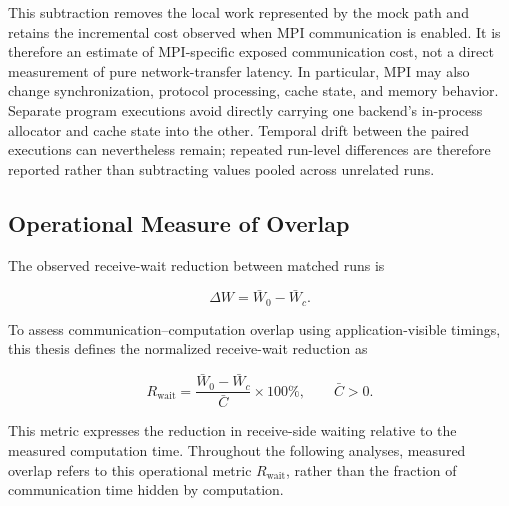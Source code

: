 This subtraction removes the local work represented by the mock path and
retains the incremental cost observed when MPI communication is enabled. It
is therefore an estimate of MPI-specific exposed communication cost, not a
direct measurement of pure network-transfer latency. In particular, MPI may
also change synchronization, protocol processing, cache state, and memory
behavior. Separate program executions avoid directly carrying one backend's
in-process allocator and cache state into the other. Temporal drift between
the paired executions can nevertheless remain; repeated run-level differences
are therefore reported rather than subtracting values pooled across unrelated
runs.

\subsection{Operational Measure of Overlap}

The observed receive-wait reduction between matched runs is

\begin{equation}
	\Delta W = \bar{W}_0-\bar{W}_c.
\end{equation}

To assess communication--computation overlap using application-visible timings,
this thesis defines the normalized receive-wait reduction as

\begin{equation}
	R_{\mathrm{wait}} = \frac{\bar{W}_0-\bar{W}_c}{\bar{C}}\times100\%,
	\qquad \bar{C}>0.
\end{equation}

This metric expresses the reduction in receive-side waiting relative to the
measured computation time. Throughout the following analyses, measured overlap
refers to this operational metric $R_{\mathrm{wait}}$, rather than the fraction
of communication time hidden by computation.

